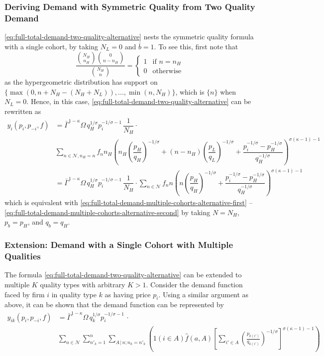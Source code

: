 \documentclass[12pt]{article}
\begin{document}
\subsubsection{Deriving Demand with Symmetric Quality from Two Quality Demand}
\eqref{eq:full-total-demand-two-quality-alternative} nests the symmetric quality formula with a single cohort, by taking $N_L = 0$ and $\bar b = 1$. To see this, first note that
\begin{equation}
\dfrac{\binom{N_H}{n_H} \binom{0}{n - n_H}}{\binom{N_H}{n}} = 
\begin{cases}
1 & \text{if $n = n_H$} \\
0 & \text{otherwise} 
\end{cases}
\end{equation}
as the hypergeometric distribution has support on $\{\max(0, n+N_H - (N_H + N_L) ), ..., \min (n, N_H )  \}$, which is $\{n\}$ when $N_L = 0$. Hence, in this case, \eqref{eq:full-total-demand-two-quality-alternative} can be rewritten as
\begin{align}
 y_{i}(p_i, p_{-i}, f) 
&=  \bar{\Gamma}^{1-\kappa}\Omega \, q_H^{1/\sigma}p_i^{-1/\sigma - 1}\, \dfrac{1}{N_H} \cdot \\ 
&\sum_{n \in \mathcal{N}, n_H = n } f_{n}  
n_H 
\left( 
n_H \left( \dfrac{p_{H}}{q_{H}}   \right)^{-1/\sigma} +  
(n - n_H) \left( \dfrac{p_{L}}{q_{L}}   \right)^{-1/\sigma} +
\dfrac{p_i^{-1/\sigma} - p^{-1/\sigma}_{H} }{ q_H^{-1/\sigma }} 
\right)^{\sigma (\kappa - 1)-1}  \\
&=  \bar{\Gamma}^{1-\kappa}\Omega \, q_H^{1/\sigma}p_i^{-1/\sigma - 1}\, \dfrac{1}{N_H} \cdot \sum_{n \in \mathcal{N}} f_{n}  
n
\left( 
n \left( \dfrac{p_{H}}{q_{H}}   \right)^{-1/\sigma} +  
\dfrac{p_i^{-1/\sigma} - p^{-1/\sigma}_{H} }{ q_H^{-1/\sigma }} 
\right)^{\sigma (\kappa - 1)-1}
\end{align}
which is equivalent with \eqref{eq:full-total-demand-multiple-cohorts-alternative-first} -- \eqref{eq:full-total-demand-multiple-cohorts-alternative-second} by taking $N = N_H$, $p_b = p_H$, and $q_b = q_H$.


\subsubsection{Extension: Demand with a Single Cohort with Multiple Qualities}
The formula \eqref{eq:full-total-demand-two-quality-alternative} can be extended to multiple $K$ quality types with arbitrary $K > 1$. Consider the demand function faced by firm $i$ in quality type $k$ as having price $p_i$. Using a similar argument as above, it can be shown that the demand function can be represented by
\begin{align}
y_{ik}(p_i, p_{-i}, f) 
&= \bar{\Gamma}^{1-\kappa}\Omega \, q_k^{1/\sigma}p_i^{-1/\sigma - 1}\, \cdot \\ 
&\sum_{n \in \mathcal{N} } \sum_{n'_k =1}^n \sum_{{A}\,|\,n; n_k = n'_k}\left( 1( i \in A ) \hat{f}(a,A)\left[\sum_{i'\in A}\left( \frac{p_{k(i')}}{q_{k(i')}}\right)^{-1/\sigma}\right]^{\sigma (\kappa - 1)-1}\right)  
\label{eq:full-total-demand-multiple-quality-summand}
\end{align}
\end{document}
